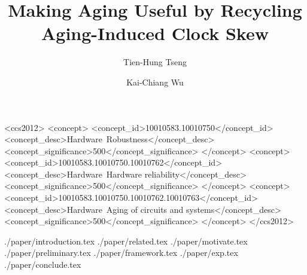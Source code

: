 \documentclass[format=acmsmall, review=false, screen=true]{acmart}
\renewcommand{\thefootnote}{\fnsymbol{footnote}}
\begin{document}
\title[Making Aging Useful by Recycling Aging-Induced Clock Skew]{\fontsize{14}{10}\selectfont Making Aging Useful by Recycling Aging-Induced Clock Skew}


\author{Tien-Hung Tseng}


\author{Kai-Chiang Wu}

\renewcommand{\thefootnote}{\fnsymbol{footnote}}
\begin{abstract}

\end{abstract}


\begin{CCSXML}
<ccs2012>
<concept>
<concept_id>10010583.10010750</concept_id>
<concept_desc>Hardware~Robustness</concept_desc>
<concept_significance>500</concept_significance>
</concept>
<concept>
<concept_id>10010583.10010750.10010762</concept_id>
<concept_desc>Hardware~Hardware reliability</concept_desc>
<concept_significance>500</concept_significance>
</concept>
<concept>
<concept_id>10010583.10010750.10010762.10010763</concept_id>
<concept_desc>Hardware~Aging of circuits and systems</concept_desc>
<concept_significance>500</concept_significance>
</concept>
</ccs2012>
\end{CCSXML}






\maketitle

%
 {./paper/introduction.tex}
 {./paper/related.tex}
 {./paper/motivate.tex}
 {./paper/preliminary.tex}
 {./paper/framework.tex}
 {./paper/exp.tex}
 {./paper/conclude.tex}







\end{document}
